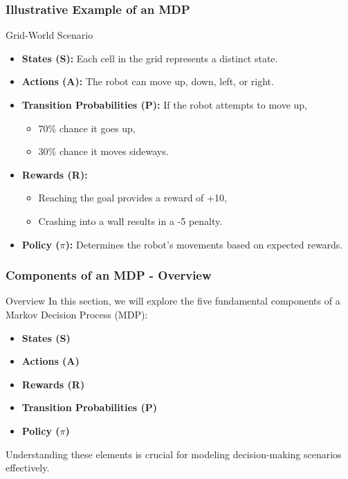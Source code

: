 \documentclass{beamer}
\begin{document}
\begin{frame}[fragile]
    \frametitle{Illustrative Example of an MDP}
    
    \begin{block}{Grid-World Scenario}
        \begin{itemize}
            \item \textbf{States (S):} Each cell in the grid represents a distinct state.
            \item \textbf{Actions (A):} The robot can move up, down, left, or right.
            \item \textbf{Transition Probabilities (P):} 
            If the robot attempts to move up, 
            \begin{itemize}
                \item 70\% chance it goes up,
                \item 30\% chance it moves sideways.
            \end{itemize}
            \item \textbf{Rewards (R):} 
            \begin{itemize}
                \item Reaching the goal provides a reward of +10,
                \item Crashing into a wall results in a -5 penalty.
            \end{itemize}
            \item \textbf{Policy ($\pi$):} Determines the robot's movements based on expected rewards.
        \end{itemize}
    \end{block}
\end{frame}

\begin{frame}[fragile]
    \frametitle{Components of an MDP - Overview}
    \begin{block}{Overview}
        In this section, we will explore the five fundamental components of a Markov Decision Process (MDP):
        \begin{itemize}
            \item \textbf{States (S)}
            \item \textbf{Actions (A)}
            \item \textbf{Rewards (R)}
            \item \textbf{Transition Probabilities (P)}
            \item \textbf{Policy ($\pi$)}
        \end{itemize}
        Understanding these elements is crucial for modeling decision-making scenarios effectively.
    \end{block}
\end{frame}
\end{document}
